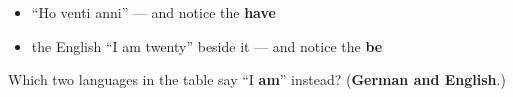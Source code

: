 \begin{itemize}
\raggedright
  \item \textquotedblleft{}Ho venti anni\textquotedblright{} — and notice the \textbf{have}
  \item the English \textquotedblleft{}I am twenty\textquotedblright{} beside it — and notice the \textbf{be}
\end{itemize}

\begin{tcolorbox}[breakable,colback=teal!4,colframe=teal!35!black,title={Before you move on}]
Which two languages in the table say \textquotedblleft{}I \textbf{am}\textquotedblright{} instead? (\textbf{German and English}.)
\end{tcolorbox}
